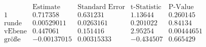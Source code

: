 \[\begin{array}{l|llll}
 \text{} & \text{Estimate} & \text{Standard Error} & \text{t-Statistic} & \text{P-Value} \\
\hline
 1 & 0.717358 & 0.631231 & 1.13644 & 0.260145 \\
 \text{runde} & 0.00529011 & 0.0263161 & 0.201022 & 0.84134 \\
 \text{vEbene} & 0.447061 & 0.151416 & 2.95254 & 0.00444651 \\
 \text{gr{\" o}{\ss}e} & -0.00137015 & 0.00315333 & -0.434507 & 0.665429 \\
\end{array}\]

